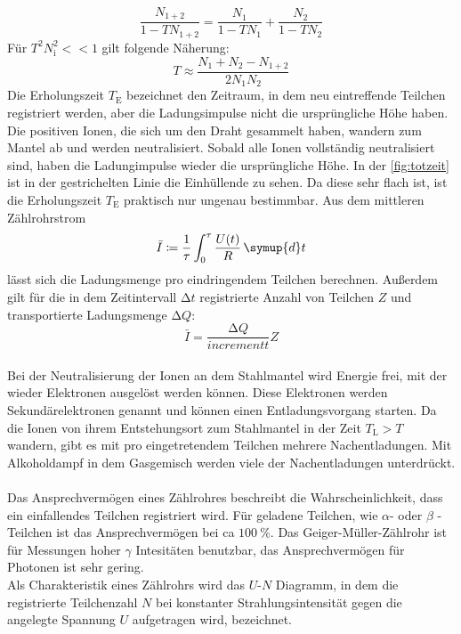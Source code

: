 \begin{equation*}
    \frac{N_{1+2}}{1-TN_{1+2}} = \frac{N_1}{1-TN_1}+\frac{N_2}{1-TN_2}
\end{equation*}
Für $T^2N_{\text{i}}^2 <<1$ gilt folgende Näherung:
\begin{equation}\label{eqn:totzeit}
    T \approx \frac{N_1 + N_2 - N_{1+2}}{2N_1N_2}
\end{equation}
Die Erholungszeit $T_{\text{E}}$ bezeichnet den Zeitraum, in dem neu eintreffende Teilchen registriert werden, aber die Ladungsimpulse nicht die ursprüngliche Höhe haben.
Die positiven Ionen, die sich um den Draht gesammelt haben, wandern zum Mantel ab und werden neutralisiert.
Sobald alle Ionen vollständig neutralisiert sind, haben die Ladungimpulse wieder die ursprüngliche Höhe.
In der \autoref{fig:totzeit} ist in der gestrichelten Linie die Einhüllende zu sehen.
Da diese sehr flach ist, ist die Erholungszeit $T_{\text{E}}$ praktisch nur ungenau bestimmbar.
Aus dem mittleren Zählrohrstrom 
 \begin{equation*}
     \bar{I} \coloneq \frac{1}{\tau} \int_0^{\tau} \frac{U(t)}{R}\,\symup{d}t
 \end{equation*} 
 lässt sich die Ladungsmenge pro eindringendem Teilchen berechnen.
 Außerdem gilt für die in dem Zeitintervall $\increment t$ registrierte Anzahl von Teilchen $Z$ und transportierte Ladungsmenge $\increment Q$:
 \begin{equation*}
     \bar{I} = \frac{\increment Q}{increment t} Z
 \end{equation*}\\
Bei der Neutralisierung der Ionen an dem Stahlmantel wird Energie frei, mit der wieder Elektronen ausgelöst werden können.
Diese Elektronen werden Sekundärelektronen genannt und können einen Entladungsvorgang starten.
Da die Ionen von ihrem Entstehungsort zum Stahlmantel in der Zeit $T_{\text{L}}>T$ wandern, gibt es mit pro eingetretendem Teilchen mehrere Nachentladungen.
Mit Alkoholdampf in dem Gasgemisch werden viele der Nachentladungen unterdrückt.\\
\\
Das Ansprechvermögen eines Zählrohres beschreibt die Wahrscheinlichkeit, dass ein einfallendes Teilchen registriert wird.
Für geladene Teilchen, wie $\alpha$- oder $\beta $ -Teilchen ist das Ansprechvermögen bei ca $\SI{100}{\percent}$.
Das Geiger-Müller-Zählrohr ist für Messungen hoher $\gamma$ Intesitäten benutzbar, das Ansprechvermögen für Photonen ist sehr gering.\\
Als Charakteristik eines Zählrohrs wird das $U$-$N$ Diagramm, in dem die registrierte Teilchenzahl $N$ bei konstanter Strahlungsintensität gegen die angelegte Spannung $U$ aufgetragen wird, bezeichnet.
